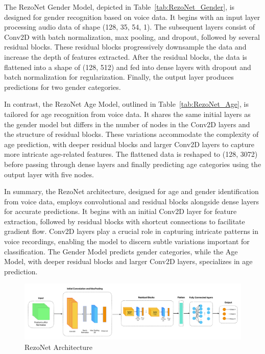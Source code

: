 \documentclass[conference, 10pt,onecolumn]{IEEEtran}
\begin{document}
The RezoNet Gender Model, depicted in Table~\ref{tab:RezoNet_Gender}, is designed for gender recognition based on voice data. It begins with an input layer processing audio data of shape (128, 35, 54, 1). The subsequent layers consist of Conv2D with batch normalization, max pooling, and dropout, followed by several residual blocks. These residual blocks progressively downsample the data and increase the depth of features extracted. After the residual blocks, the data is flattened into a shape of (128, 512) and fed into dense layers with dropout and batch normalization for regularization. Finally, the output layer produces predictions for two gender categories.

In contrast, the RezoNet Age Model, outlined in Table~\ref{tab:RezoNet_Age}, is tailored for age recognition from voice data. It shares the same initial layers as the gender model but differs in the number of nodes in the Conv2D layers and the structure of residual blocks. These variations accommodate the complexity of age prediction, with deeper residual blocks and larger Conv2D layers to capture more intricate age-related features. The flattened data is reshaped to (128, 3072) before passing through dense layers and finally predicting age categories using the output layer with five nodes.

In summary, the RezoNet architecture, designed for age and gender identification from voice data, employs convolutional and residual blocks alongside dense layers for accurate predictions. It begins with an initial Conv2D layer for feature extraction, followed by residual blocks with shortcut connections to facilitate gradient flow. Conv2D layers play a crucial role in capturing intricate patterns in voice recordings, enabling the model to discern subtle variations important for classification. The Gender Model predicts gender categories, while the Age Model, with deeper residual blocks and larger Conv2D layers, specializes in age prediction.

\begin{figure}
    \centering
    \includegraphics[width=7 in]{RezoNet Architecture.pdf}
    \caption{RezoNet Architecture}
    \label{fig:RezoNet Architecture}
\end{figure}
\end{document}
